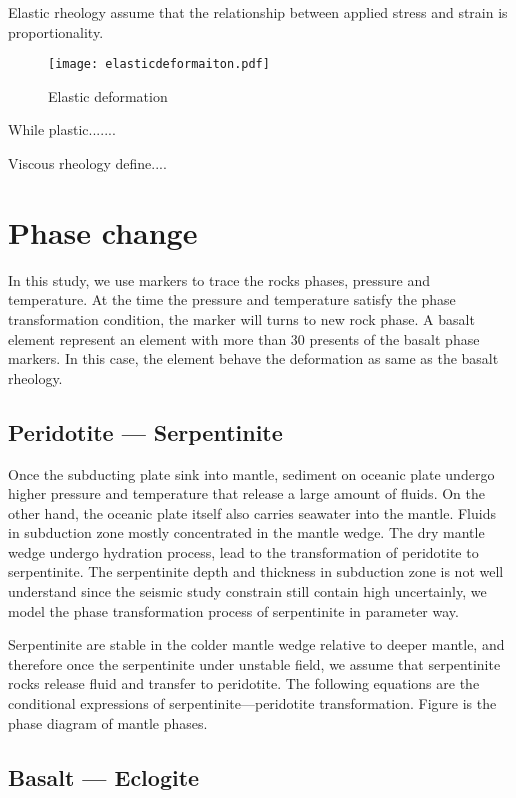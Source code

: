 Elastic rheology assume that the relationship between applied stress and strain is proportionality. 

\begin{figure*}[ht!]
    \centering
    \texttt{[image: elasticdeformaiton.pdf]}
    \caption{ Elastic deformation  }
    \label{fig::elastic}
\end{figure*}

While plastic.......


Viscous rheology define....

\section{Phase change}

In this study, we use markers to trace the rocks phases, pressure and temperature. 
At the time the pressure and temperature satisfy the phase transformation condition, the marker will turns to new rock phase. 
A basalt element represent an element with more than 30 presents of the basalt phase markers. 
In this case, the element behave the deformation as same as the basalt rheology.

\subsection{Peridotite --- Serpentinite}

Once the subducting plate sink into mantle, sediment on oceanic plate undergo higher pressure and temperature that release a large amount of fluids. 
On the other hand, the oceanic plate itself also carries seawater into the mantle. 
Fluids in subduction zone mostly concentrated in the mantle wedge. 
The dry mantle wedge undergo hydration process, lead to the transformation of peridotite to serpentinite.  
The serpentinite depth and thickness in subduction zone is not well understand since the seismic study constrain still contain high uncertainly, we model the phase transformation process of serpentinite in parameter way.     

Serpentinite are stable in the colder mantle wedge relative to deeper mantle, and therefore once the serpentinite under unstable field, we assume that serpentinite rocks release fluid and transfer to peridotite. 
The following equations are the conditional expressions of serpentinite---peridotite transformation. Figure is the phase diagram of mantle phases.


\subsection{Basalt --- Eclogite}

